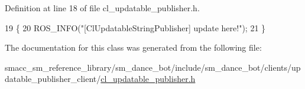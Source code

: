 Definition at line 18 of file cl\+\_\+updatable\+\_\+publisher.\+h.


\begin{DoxyCode}
19     \{
20         ROS\_INFO(\textcolor{stringliteral}{"[ClUpdatableStringPublisher] update here!"});
21     \}
\end{DoxyCode}


The documentation for this class was generated from the following file\+:\begin{DoxyCompactItemize}
\item 
smacc\+\_\+sm\+\_\+reference\+\_\+library/sm\+\_\+dance\+\_\+bot/include/sm\+\_\+dance\+\_\+bot/clients/updatable\+\_\+publisher\+\_\+client/\hyperlink{cl__updatable__publisher_8h}{cl\+\_\+updatable\+\_\+publisher.\+h}\end{DoxyCompactItemize}
